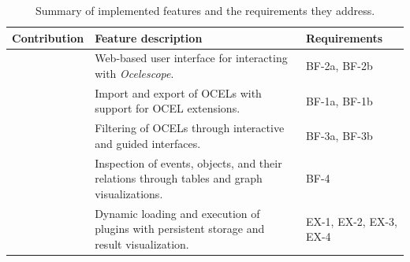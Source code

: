 \begin{table}[h]
	\centering
	\small
	\setlength{\tabcolsep}{6pt}
	\renewcommand{\arraystretch}{1.25}
	\caption{Summary of implemented features and the requirements they address.}
	\label{tab:feature-summary}
	\begin{tabularx}{\linewidth}{
		|>{\arraybackslash}m{2.9cm}
		|X
		|>{\raggedright\arraybackslash}m{2.5cm}|
		}
		\hline
		\textbf{Contribution}                                                     & \textbf{Feature description}                                                                & \textbf{Requirements} \\
		\hline

		\multirow[c]{5}{*}{\textbf{Web Application}}                              &
		Web-based user interface for interacting with \textit{Ocelescope}.        &
		BF-2a, BF-2b                                                                                                                                                                                    \\
		\cline{2-3}
		                                                                          & Import and export of OCELs with support for OCEL extensions.                                &
		BF-1a, BF-1b                                                                                                                                                                                    \\
		\cline{2-3}
		                                                                          & Filtering of OCELs through interactive and guided interfaces.                               &
		BF-3a, BF-3b                                                                                                                                                                                    \\
		\cline{2-3}
		                                                                          & Inspection of events, objects, and their relations through tables and graph visualizations. &
		BF-4                                                                                                                                                                                            \\
		\cline{2-3}
		                                                                          & Dynamic loading and execution of plugins with persistent storage and result visualization.  &
		EX-1, EX-2, EX-3, EX-4                                                                                                                                                                          \\
		\hline


\end{tabularx}
\end{table}
